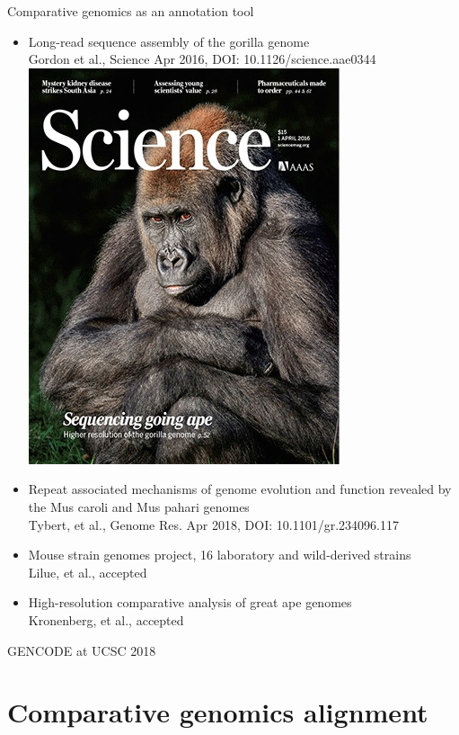 \documentclass[10pt,
               hyperref={bookmarks=false,
                         bookmarksopen=false,
                         colorlinks=true,
                         linkcolor=blue,
                         urlcolor=blue},
               xcolor={svgnames,table}]{beamer}
\newcommand{\sectionframe}[1]{
  \begin{frame}{GENCODE at UCSC 2018}
    \section{#1}
  \end{frame}
}
\begin{document}
\begin{frame}{Comparative genomics as an annotation tool}
  \centering
  \begin{itemize}
  \item Long-read sequence assembly of the gorilla genome \\
    Gordon et al., Science Apr 2016, DOI: 10.1126/science.aae0344 \\
    \includegraphics[scale=0.1]{images/science-gorilla.jpg}
  \item Repeat associated mechanisms of genome evolution and function revealed by the Mus caroli and Mus pahari genomes \\
    Tybert, et al., Genome Res. Apr 2018, DOI: 10.1101/gr.234096.117
  \item Mouse strain genomes project, 16 laboratory and wild-derived strains \\
    Lilue, et al., accepted
  \item High-resolution comparative analysis of great ape genomes \\
    Kronenberg, et al., accepted
  \end{itemize}
\end{frame}

\sectionframe{Comparative genomics alignment}
\end{document}
